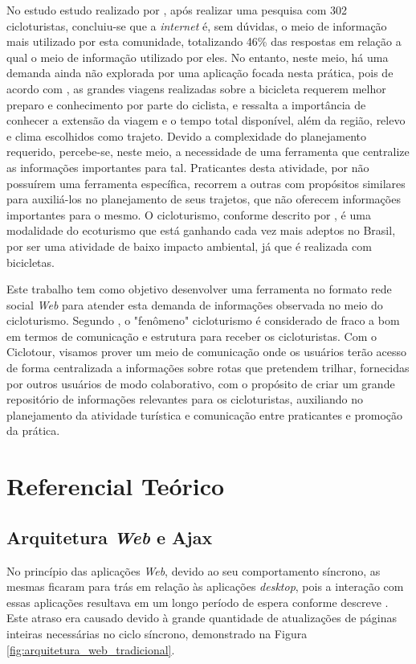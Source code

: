 No estudo estudo realizado por , após realizar uma pesquisa com 302 cicloturistas, concluiu-se que a \textit{internet}
é, sem dúvidas, 
o meio de informação mais utilizado por esta comunidade, totalizando 46\% das respostas em relação a qual o meio de informação utilizado por eles.
No entanto, neste meio, há uma demanda ainda não explorada por uma aplicação focada nesta prática, pois de acordo com , 
as grandes viagens realizadas sobre a bicicleta requerem melhor preparo e conhecimento por parte do ciclista, e ressalta a importância de  
conhecer a extensão da viagem e o tempo total disponível, além da região, relevo e clima escolhidos como trajeto. 
Devido a complexidade do planejamento
requerido, percebe-se, neste meio, a necessidade de uma ferramenta que centralize as informações importantes para tal. 
Praticantes desta atividade, por não 
possuírem uma ferramenta específica, recorrem a outras com propósitos similares para auxiliá-los no planejamento de seus trajetos, que não oferecem 
informações importantes para o mesmo. O cicloturismo, conforme descrito por , é uma modalidade do ecoturismo que está 
ganhando cada vez mais adeptos no Brasil, por ser uma atividade de baixo impacto ambiental, já que é realizada com bicicletas.

Este trabalho tem como objetivo desenvolver uma ferramenta no formato rede social \textit{Web} para atender esta demanda de 
informações observada 
no meio do cicloturismo. Segundo , o  "fenômeno" cicloturismo é considerado de fraco a bom em termos de comunicação 
e estrutura para receber os cicloturistas. Com o Ciclotour, visamos prover um meio de comunicação onde os
usuários terão acesso de 
forma centralizada a informações sobre rotas que pretendem trilhar, fornecidas por outros usuários de modo colaborativo, com o propósito 
de criar um grande repositório de informações relevantes para os cicloturistas, auxiliando no planejamento da atividade turística e comunicação 
entre praticantes e promoção da prática.

\section{\esp Referencial Teórico}
\subsection{Arquitetura \textit{Web} e Ajax}
No princípio das aplicações \textit{Web}, devido ao seu comportamento síncrono, as mesmas ficaram para trás em relação às 
aplicações \textit{desktop}, pois a 
interação com essas aplicações resultava em um longo período de espera conforme descreve . Este atraso era causado devido 
à grande 
quantidade de atualizações de páginas inteiras necessárias no ciclo síncrono, demonstrado na Figura \ref{fig:arquitetura_web_tradicional}. 

